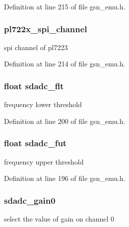 Definition at line 215 of file gsn\_\-emu.h.

\hypertarget{a00058_acfb3ddea6819d5565b7bee5bdd386b4a}{
\subsubsection[{pl722x\_\-spi\_\-channel}]{ {\bf pl722x\_\-spi\_\-channel}}}
\label{a00058_acfb3ddea6819d5565b7bee5bdd386b4a}
spi channel of pl7223 

Definition at line 214 of file gsn\_\-emu.h.

\hypertarget{a00058_a243eb8c9f95c247490b3dea1b8a407c4}{
\subsubsection[{sdadc\_\-flt}]{\setlength{\rightskip}{0pt plus 5cm}float {\bf sdadc\_\-flt}}}
\label{a00058_a243eb8c9f95c247490b3dea1b8a407c4}
frequency lower threshold 

Definition at line 200 of file gsn\_\-emu.h.

\hypertarget{a00058_a83a087ad5c26cd2feb06c906f5638d9e}{
\subsubsection[{sdadc\_\-fut}]{\setlength{\rightskip}{0pt plus 5cm}float {\bf sdadc\_\-fut}}}
\label{a00058_a83a087ad5c26cd2feb06c906f5638d9e}
frequency upper threshold 

Definition at line 196 of file gsn\_\-emu.h.

\hypertarget{a00058_a2a6c84b950292bc3d52b6260a1115e89}{
\subsubsection[{sdadc\_\-gain0}]{ {\bf sdadc\_\-gain0}}}
\label{a00058_a2a6c84b950292bc3d52b6260a1115e89}
select the value of gain on channel 0 

